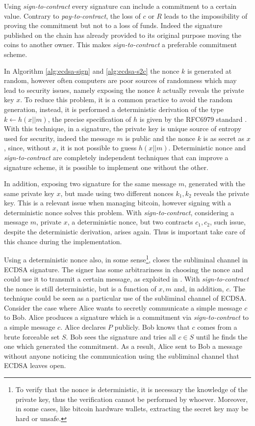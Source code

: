 Using \textit{sign-to-contract} every signature can include a commitment to a certain value. Contrary to \textit{pay-to-contract}, the loss of $c$ or $R$ leads to the impossibility of proving the commitment but not to a loss of funds. Indeed the signature published on the chain has already provided to its original purpose moving the coins to another owner. This makes \textit{sign-to-contract} a preferable commitment scheme.

In Algorithm \ref{alg:ecdsa-sign} and \ref{alg:ecdsa-s2c} the nonce $k$ is generated at random, however often computers are poor sources of randomness which may lead to security issues, namely exposing the nonce $k$ actually reveals the private key $x$. 
To reduce this problem, it is a common practice to avoid the random generation, instead, it is performed a deterministic derivation of the type $k \gets h(x||m)$, the precise specification of $h$ is given by the RFC6979 standard \cite{rfc6979}. With this technique,  in a signature, the private key is unique source of entropy used for security, indeed the message $m$ is public and the nonce $k$ is as secret as $x$, since, without $x$, it is not possible to guess $h(x||m)$.
Deterministic nonce and \textit{sign-to-contract} are completely independent techniques that can improve a signature scheme, it is possible to implement one without the other.

In addition, exposing two signature for the same message $m$, generated with the same private key $x$, but made using two different nonces $k_1, k_2$ reveals the private key.
This is a relevant issue when managing bitcoin, however signing with a deterministic nonce solves this problem.
With \textit{sign-to-contract}, considering a message $m$, private $x$, a deterministic nonce, but two contracts $c_1, c_2$, such issue, despite the deterministic derivation, arises again. 
Thus is important take care of this chance during the implementation.

Using a deterministic nonce also, in some sense\footnote{To verify that the nonce is deterministic, it is necessary the knowledge of the private key, thus the verification cannot be performed by whoever. Moreover, in some cases, like bitcoin hardware wallets, extracting the secret key may be hard or unsafe.}, closes the subliminal channel in ECDSA signature. 
The signer has some arbitrariness in choosing the nonce and could use it to transmit a certain message, as exploited in \cite{DBLP:journals/jsac/Simmons98}. 
With \textit{sign-to-contract} the nonce is still deterministic, but is a function of $x,m$ and, in addition, $c$. 
The technique could be seen as a particular use of the subliminal channel of ECDSA.
Consider the case where Alice wants to secretly communicate a simple message $c$ to Bob. Alice produces a signature which is a commitment via \textit{sign-to-contract} to a simple message $c$. Alice declares $P$ publicly. Bob knows that $c$ comes from a brute forceable set $S$. Bob sees the signature and tries all $c \in S$ until he finds the one which generated the commitment. As a result, Alice sent to Bob a message without anyone noticing the communication using the subliminal channel that ECDSA leaves open.